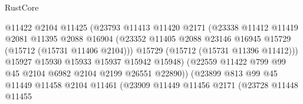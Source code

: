 \begin{lexlean}{RustCore}
\begin{coremodule}
                                      @11422
                                      @2104
                                      @11425
                                      (@23793
                                        @11413
                                        @11420
                                        @2171
                                        (@23338
                                          @11412
                                          @11419
                                          @2081
                                          @11395
                                          @2088
                                          @16904
                                          (@23352
                                            @11405
                                            @2088
                                            @23146
                                            @16945
                                            @15729
                                            (@15712 (@15731 @11406 @2104)))
                                          @15729
                                          (@15712 (@15731 @11396 @11412)))
                                        @15927
                                        @15930
                                        @15933
                                        @15937
                                        @15942
                                        @15948)
                                      (@22559
                                        @11422
                                        @799
                                        @99
                                        @45
                                        @2104
                                        @6982
                                        @2104
                                        @2199
                                        @26551
                                        @22890))
                                    (@23899
                                      @813
                                      @99
                                      @45
                                      @11449
                                      @11458
                                      @2104
                                      @11461
                                      (@23909
                                        @11449
                                        @11456
                                        @2171
                                        (@23728
                                          @11448
                                          @11455

\end{coremodule}
\end{lexlean}
